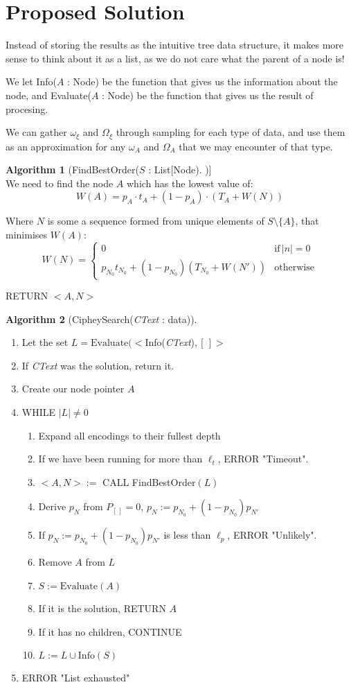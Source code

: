 \documentclass{article}
\theoremstyle{definition}
\newtheorem{algorithm}{Algorithm}
\begin{document}
\section{Proposed Solution}
Instead of storing the results as the intuitive tree data structure, it makes more
sense to think about it as a list, as we do not care what the parent of a node is!

We let Info($A$ : Node) be the function that gives us the information about the 
node, and Evaluate($A$ : Node) be the function that gives us the result of 
procesing.

We can gather $\omega_\xi$ and $\Omega_\xi$ through sampling for each type 
of data, and use them as an approximation for any $\omega_A$ and $\Omega_A$ that
we may encounter of that type.

\begin{algorithm}[FindBestOrder($S$ : List[Node])]\,\\
We need to find the node $A$ which has the lowest value of:
\[
	W(A) =  p_A \cdot t_A + (1 - p_A) \cdot (T_A + W(N))
\]

	Where $N$ is some a sequence formed from unique elements of $S \setminus \{A\}$, that minimises $W(A)$:
\[ 
	W(N) = 
	\begin{cases}
		0 & \text{if}\,|n| = 0 \\
		p_{N_0} t_{N_0} + (1 - p_{N_0}) (T_{N_0} + W(N')) & \text{otherwise}
	\end{cases}
\]

RETURN $<A, N>$
\end{algorithm}

\begin{algorithm}[CipheySearch(\textit{CText} : data)]\,\\
\begin{enumerate}
\item Let the set $L = \text{Evaluate}(<$Info(\textit{CText})$, [\,]>$
\item If \textit{CText} was the solution, return it.
\item Create our node pointer $A$
\item WHILE $|L| \neq 0$
	\begin{enumerate}
	\item Expand all encodings to their fullest depth
	\item If we have been running for more than $\ell_t$, ERROR "Timeout".
	\item $<A, N> := $ CALL FindBestOrder$(L)$
	\item Derive $p_N$ from $P_{[\,]} = 0$, $p_N := p_{N_0} + (1-p_{N_0})p_{N'}$
	\item If $p_N := p_{N_0} + (1-p_{N_0})p_{N'}$ is less than $\ell_p$, ERROR "Unlikely".
	\item Remove $A$ from $L$
	\item $S := \text{Evaluate}(A)$
	\item If it is the solution, RETURN $A$
	\item If it has no children, CONTINUE
	\item $L := L \cup \text{Info}(S)$
	\end{enumerate}
\item ERROR "List exhausted"
\end{enumerate}
\end{algorithm}
\end{document}
